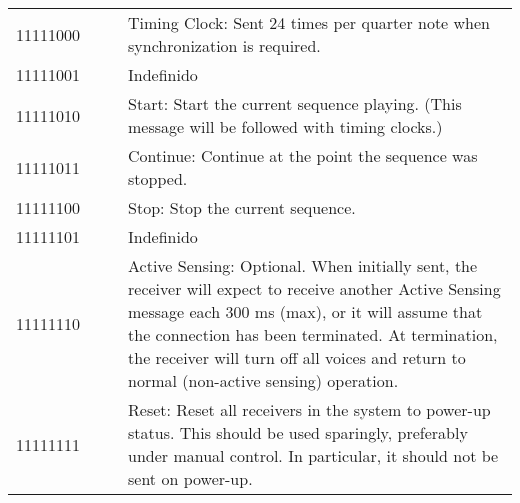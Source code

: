 
        \begin{center}
        \tablelasttail{\hline}
        \begin{supertabular}{| C{2cm} | C{2cm} | C{2.3cm} | C{8cm} |}
             11111000 &  &  & Timing Clock: Sent 24 times per quarter note when synchronization is required. \\
                11111001 &  &  & Indefinido \\
             11111010 &  &  & Start: Start the current sequence playing. (This message will be followed with timing clocks.) \\
                11111011 &  &  & Continue: Continue at the point the sequence was stopped. \\
             11111100 &  &  & Stop: Stop the current sequence. \\
                11111101 &  &  & Indefinido           \\
             11111110 &  &  & Active Sensing: Optional. When initially sent, the receiver will expect to receive another Active Sensing message each 300 ms (max), or it will assume that the connection has been terminated. At termination, the receiver will turn off all voices and return to normal (non-active sensing) operation. \\
                11111111 &  &  & Reset: Reset all receivers in the system to power-up status. This should be used sparingly, preferably under manual control. In particular, it should not be sent on power-up. \\
        \end{supertabular}
        \end{center}